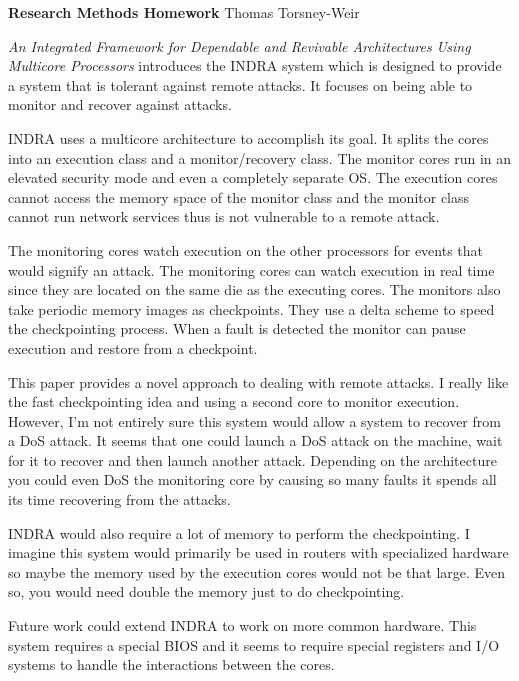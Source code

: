 \documentclass[12pt]{article}
\begin{document}
{\bf Research Methods Homework} \hfill {\raggedleft Thomas Torsney-Weir}

{\em An Integrated Framework for Dependable and Revivable Architectures 
Using Multicore Processors} introduces the INDRA system which is designed
to provide a system that is tolerant against remote attacks.  It focuses on
being able to monitor and recover against attacks.

INDRA uses a multicore architecture to accomplish its goal.  It splits the
cores into an execution class and a monitor/recovery class.  The monitor cores
run in an elevated security mode and even  a completely separate OS.  The
execution cores cannot access the memory space of the monitor class and the
monitor class cannot run network services thus is not vulnerable to a remote
attack.  

The monitoring cores watch execution on the other processors for events
that would signify an attack.  The monitoring cores can watch execution
in real time since they are located on the same die as the executing cores.
The monitors also take periodic memory images as checkpoints.  They use a
delta scheme to speed the checkpointing process.  When a fault is detected
the monitor can pause execution and restore from a checkpoint.

This paper provides a novel approach to dealing with remote attacks.  I
really like the fast checkpointing idea and using a second core to monitor
execution.  However, I'm not entirely sure this system would allow a system
to recover from a DoS attack.  It seems that one could launch a DoS attack
on the machine, wait for it to recover and then launch another attack.  
Depending on the architecture you could even DoS the monitoring core by
causing so many faults it spends all its time recovering from the attacks.

INDRA would also require a lot of memory to perform the checkpointing.  I
imagine this system would primarily be used in routers with specialized
hardware so maybe the memory used by the execution cores would not be that
large.  Even so, you would need double the memory just to do checkpointing.

Future work could extend INDRA to work on more common hardware.  This system
requires a special BIOS and it seems to require special registers and I/O
systems to handle the interactions between the cores.  
\end{document}

